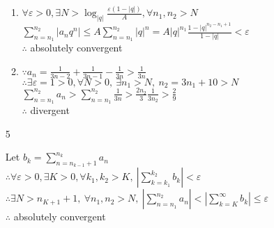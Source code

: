\begin{enumerate}[1]
\begin{enumerate}[(1)]
	\item 
	\(\forall \varepsilon>0, \exists N>\log _{|q|} \frac{\varepsilon(1-|q|)}{A}, \forall n_{1}, n_{2}>N\)\\
 	\(\sum\limits_{n=n_{1}}^{n_{2}}\left|a_{n} q^{n}\right| \leqslant A \sum\limits_{n=n_{1}}^{n_{2}}|q|^{n}=A|q|^{n_{1}} \frac{1-|q|^{n_{2}-n_{1}+1}}{1-|q|}<\varepsilon\)\\
	\(\therefore\) absolutely convergent

	\item 
	\(\because a_n=\frac{1}{3 n-2}+\frac{1}{3 n-1}-\frac{1}{3 n}>\frac{1}{3 n}\)\\
	\(\therefore \exists \varepsilon=1>0, \forall N>0,\  \exists n_{1} >N,\ n_2=3n_1+10>N	\)\\
	\(\sum\limits_{n=n_{1}}^{n_{2}} a_{n}>\sum\limits_{n=n_1}^{n_2} \frac{1}{3 n}>\frac{2n_2}{3}\frac{1}{3n_2}>\frac{2}{9}\)\\
	\(\therefore\) divergent


\end{enumerate}
	\item[5]   	
	
	Let \(b_{k}=\sum\limits_{n=n_{k-1}+1}^{n_{k}} a_{n}\)\\
	\(\therefore \forall \varepsilon>0, \exists K>0, \forall k_{1}, k_{2}>K,\ \left|\sum\limits_{k=k_{1}}^{k_{2}} b_{k}\right|<\varepsilon\)\\
	\(\therefore \exists N>n_{K+1}+1,\  \forall n_{1}, n_{2}>N,\ \left|\sum\limits_{n=n_{1}}^{n_{2}} a_{n}\right|<\left|\sum\limits_{k=K}^{\infty} b_{k}\right| \leqslant \varepsilon\)\\
	\(\therefore\) absolutely convergent
	
\end{enumerate}